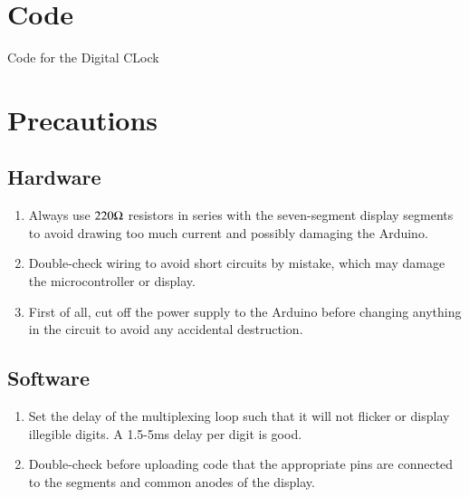 \documentclass[journal]{IEEEtran}
\numberwithin{equation}{enumi}
\numberwithin{figure}{enumi}
\begin{document}
\section{Code}
{Code for the Digital CLock}


\section{Precautions}
\subsection{Hardware}
\begin{enumerate}
    \item  Always use ${220}{\ohm}$ resistors in series with the seven-segment display segments to avoid drawing too much current and possibly damaging the Arduino.
    \item  Double-check wiring to avoid short circuits by mistake, which may damage the microcontroller or display.
    \item First of all, cut off the power supply to the Arduino before changing anything in the circuit to avoid any accidental destruction.
\end{enumerate}

\subsection{Software}
\begin{enumerate}
    \item Set the delay of the multiplexing loop such that it will not flicker or display illegible digits. A 1.5-5ms delay per digit is good.
    \item Double-check before uploading code that the appropriate pins are connected to the segments and common anodes of the display.
\end{enumerate}
\end{document}
